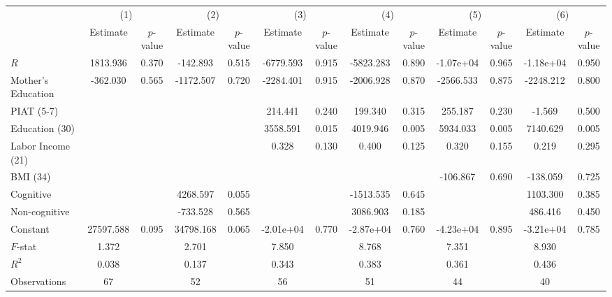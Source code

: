\begin{table}[htbp]
\begin{tabular}{lcccccccccccc} \toprule
 & \multicolumn{2}{c}{(1)}  &  \multicolumn{2}{c}{(2)}  &  \multicolumn{2}{c}{(3)}  &  \multicolumn{2}{c}{(4)}  & \multicolumn{2}{c}{(5)} & \multicolumn{2}{c}{(6)} \\  
 & Estimate & $p$-value & Estimate & $p$-value & Estimate & $p$-value & Estimate & $p$-value & Estimate & $p$-value & Estimate & $p$-value \\ \midrule
$R$ &  1813.936 &     0.370 &  -142.893 &     0.515 & -6779.593 &     0.915 & -5823.283 &     0.890 & -1.07e+04 &     0.965 & -1.18e+04 &     0.950 \\  
Mother's Education &  -362.030 &     0.565 & -1172.507 &     0.720 & -2284.401 &     0.915 & -2006.928 &     0.870 & -2566.533 &     0.875 & -2248.212 &     0.800 \\  
PIAT (5-7) &         &         &         &         &   214.441 &     0.240 &   199.340 &     0.315 &   255.187 &     0.230 &    -1.569 &     0.500 \\  
Education (30) &         &         &         &         &  3558.591 &     0.015 &  4019.946 &     0.005 &  5934.033 &     0.005 &  7140.629 &     0.005 \\  
Labor Income (21) &         &         &         &         &     0.328 &     0.130 &     0.400 &     0.125 &     0.320 &     0.155 &     0.219 &     0.295 \\  
BMI (34) &         &         &         &         &         &         &         &         &  -106.867 &     0.690 &  -138.059 &     0.725 \\  
Cognitive &         &         &  4268.597 &     0.055 &         &         & -1513.535 &     0.645 &         &         &  1103.300 &     0.385 \\  
Non-cognitive &         &         &  -733.528 &     0.565 &         &         &  3086.903 &     0.185 &         &         &   486.416 &     0.450 \\  
Constant & 27597.588 &     0.095 & 34798.168 &     0.065 & -2.01e+04 &     0.770 & -2.87e+04 &     0.760 & -4.23e+04 &     0.895 & -3.21e+04 &     0.785 \\  \midrule
$F$-stat &     1.372 &         &     2.701 &         &     7.850 &         &     8.768 &         &     7.351 &         &     8.930 &         \\  
$R^2$ &     0.038 &         &     0.137 &         &     0.343 &         &     0.383 &         &     0.361 &         &     0.436 &         \\  
Observations &    67 &         &    52 &         &    56 &         &    51 &         &    44 &         &    40 &         \\  
\bottomrule \end{tabular}
\end{table}
